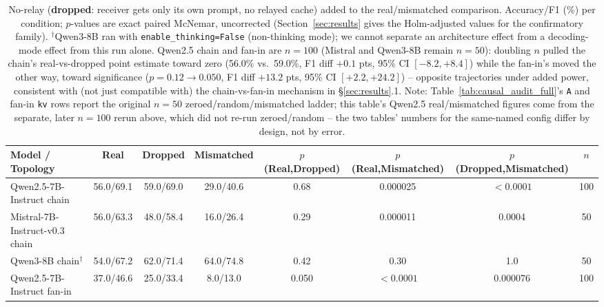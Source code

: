 
\begin{table}[t]
\centering
\small
\begin{tabular}{lccccccc}
\toprule
\textbf{Model / Topology} & \textbf{Real} & \textbf{Dropped} & \textbf{Mismatched} & \textbf{$p$(Real,Dropped)} & \textbf{$p$(Real,Mismatched)} & \textbf{$p$(Dropped,Mismatched)} & \textbf{$n$} \\
\midrule
Qwen2.5-7B-Instruct chain          & 56.0/69.1 & 59.0/69.0 & 29.0/40.6 & 0.68   & 0.000025 & $<0.0001$ & 100 \\
Mistral-7B-Instruct-v0.3 chain     & 56.0/63.3 & 48.0/58.4 & 16.0/26.4 & 0.29   & 0.000011 & 0.0004   & 50 \\
Qwen3-8B chain$^\dagger$           & 54.0/67.2 & 62.0/71.4 & 64.0/74.8 & 0.42   & 0.30     & 1.0      & 50 \\
Qwen2.5-7B-Instruct fan-in         & 37.0/46.6 & 25.0/33.4 & 8.0/13.0 & 0.050  & $<0.0001$ & 0.000076 & 100 \\
\bottomrule
\end{tabular}
\caption{No-relay (\textbf{dropped}: receiver gets only its own prompt, no
relayed cache) added to the real/mismatched comparison. Accuracy/F1 (\%) per
condition; $p$-values are exact paired McNemar, uncorrected (Section~\ref{sec:results}
gives the Holm-adjusted values for the confirmatory family). $^\dagger$Qwen3-8B
ran with \texttt{enable\_thinking=False} (non-thinking mode); we cannot
separate an architecture effect from a decoding-mode effect from this run
alone. Qwen2.5 chain and fan-in are $n=100$ (Mistral and Qwen3-8B remain
$n=50$): doubling $n$ pulled the chain's real-vs-dropped point estimate
toward zero (56.0\% vs.\ 59.0\%, F1 diff $+0.1$ pts, 95\% CI $[-8.2,
+8.4]$) while the fan-in's moved the other way, toward significance
($p=0.12\to0.050$, F1 diff $+13.2$ pts, 95\% CI $[+2.2, +24.2]$) --
opposite trajectories under added power, consistent with (not just
compatible with) the chain-vs-fan-in mechanism in \S\ref{sec:results}.1.
Note: Table~\ref{tab:causal_audit_full}'s \texttt{A} and fan-in
\texttt{kv} rows report the original $n=50$ zeroed/random/mismatched
ladder; this table's Qwen2.5 real/mismatched figures come from the
separate, later $n=100$ rerun above, which did not re-run
zeroed/random -- the two tables' numbers for the same-named config
differ by design, not by error.}
\label{tab:no_relay}
\end{table}
